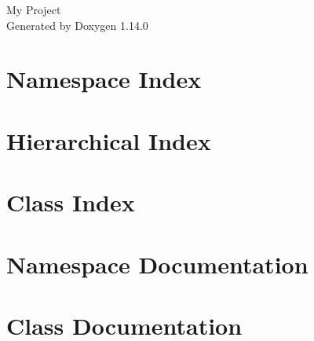 \documentclass[twoside]{book}
\newcommand{\+}{\discretionary{\mbox{\scriptsize$\hookleftarrow$}}{}{}}
\newcommand{\clearemptydoublepage}{%
    \newpage{\pagestyle{empty}\cleardoublepage}%
  }
\begin{document}
  \raggedbottom
    \hypersetup{pageanchor=false,
                bookmarksnumbered=true,
                pdfencoding=unicode
               }
  \begin{titlepage}
  \vspace*{7cm}
  \begin{center}%
  {\Large My Project}\\
  \vspace*{1cm}
  {\large Generated by Doxygen 1.14.0}\\
  \end{center}
  \end{titlepage}
  \clearemptydoublepage
  \tableofcontents
  \clearemptydoublepage
  \hypersetup{pageanchor=true}
\chapter{Namespace Index}

\chapter{Hierarchical Index}

\chapter{Class Index}

\chapter{Namespace Documentation}






\chapter{Class Documentation}





  \backmatter
  \newpage
  \clearemptydoublepage
  \printindex
\end{document}
